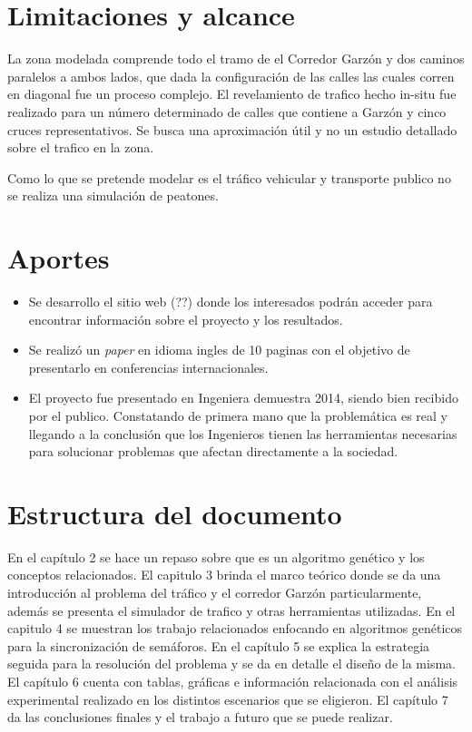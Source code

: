 \section{Limitaciones y alcance}

La zona modelada comprende todo el tramo de el Corredor Garzón y dos caminos paralelos a ambos lados, que dada la configuración de las calles las cuales corren en diagonal fue un proceso complejo.
El revelamiento de trafico hecho in-situ fue realizado para un número determinado de calles que contiene a Garzón y cinco cruces representativos. Se busca una aproximación útil y no un estudio detallado sobre el trafico en la zona.

Como lo que se pretende modelar es el tráfico vehicular y transporte publico no se realiza una simulación de peatones.


\section{Aportes}

\begin{itemize}
	\item Se desarrollo el sitio web (??) donde los interesados podrán acceder para encontrar información sobre el proyecto y los resultados.
	\item Se realizó un \emph{paper} en idioma ingles de 10 paginas con el objetivo de presentarlo en conferencias internacionales.
	\item El proyecto fue presentado en Ingeniera demuestra 2014, siendo bien recibido por el publico. Constatando de primera mano que la problemática es real y llegando a la conclusión que los Ingenieros tienen las herramientas necesarias para solucionar problemas que afectan directamente a la sociedad.

\end{itemize}






\section{Estructura del documento}
En el capítulo 2 se hace un repaso sobre que es un algoritmo genético y los conceptos relacionados.
El capitulo 3 brinda el marco teórico donde se da una introducción al problema del tráfico y el corredor Garzón particularmente, además se presenta el simulador de trafico y otras herramientas utilizadas.
En el capitulo 4 se muestran los trabajo relacionados enfocando en algoritmos genéticos para la sincronización de semáforos.
En el capítulo 5 se explica la estrategia seguida para la resolución del problema y se da en detalle el diseño de la misma.
El capítulo 6 cuenta con tablas, gráficas e información relacionada con el análisis experimental realizado en los distintos escenarios que se eligieron.
El capítulo 7 da las conclusiones finales y el trabajo a futuro que se puede realizar.







